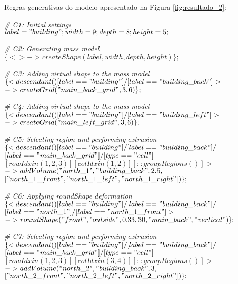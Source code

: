 \label{an:ex_anexo_a}

Regras generativas do modelo apresentado na Figura \ref{fig:resultado_2}:

\noindent \textit{\# C1: Initial settings}\\
$label = "building"; width = 9; depth = 8; height = 5;$

\noindent \textit{\# C2: Generating mass model}\\
$\{<> -> createShape(label, width, depth, height)\};$

\noindent \textit{\# C3: Adding virtual shape to the mass model}\\
$\{< descendant() [label=="building"] / [label=="building\_back"] > $\\
$-> createGrid("main\_back\_grid", 3, 6)\};$

\noindent \textit{\# C4: Adding virtual shape to the mass model}\\
$\{< descendant() [label=="building"] / [label=="building\_left"] > $\\
$-> createGrid("main\_left\_grid", 3, 6)\};$

\noindent \textit{\# C5: Selecting region and performing extrusion}\\
$\{< descendant() [label=="building"] / [label=="building\_back"] / $\\
$[label=="main\_back\_grid"] / [type=="cell"] $\\
$[rowIdx in (1, 2, 3)] [colIdx in (1, 2)] [::groupRegions()] > $\\
$-> addVolume("north\_1", "building\_back", 2.5, $\\
$["north\_1\_front", "north\_1\_left", "north\_1\_right"])\};$

\noindent \textit{\# C6: Applying roundShape deformation}\\
$\{< descendant() [label=="building"] / [label=="building\_back"] / $\\
$[label=="north\_1"] / [label=="north\_1\_front"] > $\\
$-> roundShape("front", "outside", 0.33, 30, "main\_back", "vertical")\};$

\noindent \textit{\# C7: Selecting region and performing extrusion}\\
$\{< descendant() [label=="building"] / [label=="building\_back"] / $\\
$[label=="main\_back\_grid"] / [type=="cell"] $\\
$[rowIdx in (1, 2, 3)] [colIdx in (3, 4)] [::groupRegions()] > $\\
$-> addVolume("north\_2", "building\_back", 3, $\\
$["north\_2\_front", "north\_2\_left", "north\_2\_right"])\};$

